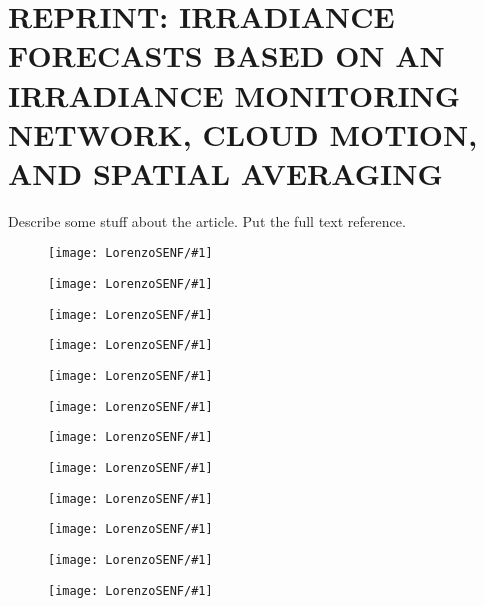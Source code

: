 \chapter{REPRINT: IRRADIANCE FORECASTS BASED ON AN IRRADIANCE MONITORING NETWORK, CLOUD MOTION, AND SPATIAL AVERAGING}
\label{app:network}
Describe some stuff about the article. Put the full text reference.

\newcommand{\figNF}[1]{
\begin{figure}
\texttt{[image: LorenzoSENF/\#1]}
\end{figure}
}


\figNF{pg1}
\figNF{pg2}
\figNF{pg3}
\figNF{pg4}
\figNF{pg5}
\figNF{pg6}
\figNF{pg7}
\figNF{pg8}
\figNF{pg9}
\figNF{pg10}
\figNF{pg11}
\figNF{pg12}

